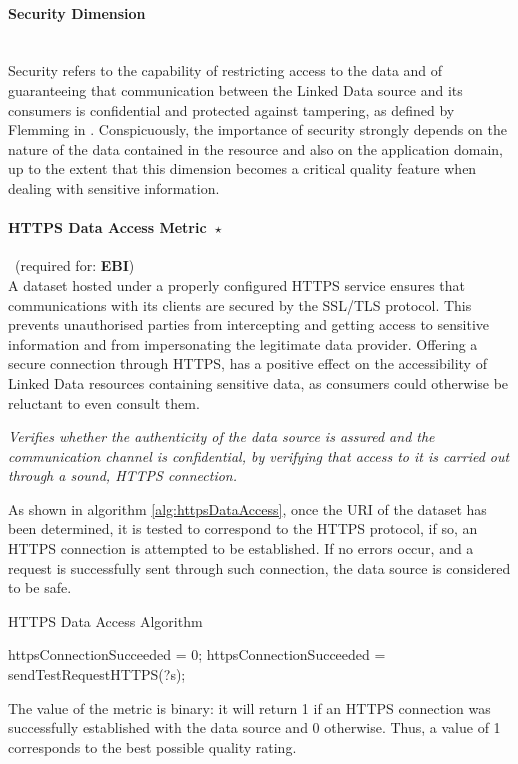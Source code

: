 

\paragraph{Security Dimension}~\\ %
Security refers to the capability of restricting access to the data and of guaranteeing that communication between the Linked Data source and its consumers is confidential and protected against tampering, as defined by Flemming in \cite{Flemming2008}. Conspicuously, the importance of security strongly depends on the nature of the data contained in the resource and also on the application domain, up to the extent that this dimension becomes a critical quality feature when dealing with sensitive information.


\paragraph{HTTPS Data Access Metric~$\star$}~(required for: \textbf{EBI}) ~\\ %
A dataset hosted under a properly configured HTTPS service ensures that communications with its clients are secured by the SSL/TLS protocol. This prevents unauthorised parties from intercepting and getting access to sensitive information and from impersonating the legitimate data provider. Offering a secure connection through HTTPS, has a positive effect on the accessibility of Linked Data resources containing sensitive data, as consumers could otherwise be reluctant to even consult them.

\begin{mdframed}[style=metricdefinition]
\emph{Verifies whether the authenticity of the data source is assured and the communication channel is confidential, by verifying that access to it is carried out through a sound, HTTPS connection.}
\end{mdframed}

As shown in algorithm \ref{alg:httpsDataAccess}, once the URI of the dataset has been determined, it is tested to correspond to the HTTPS protocol, if so, an HTTPS connection is attempted to be established. If no errors occur, and a request is successfully sent through such connection, the data source is considered to be safe.
\begin{algorithm}
\caption{HTTPS Data Access Algorithm} \label{alg:httpsDataAccess}
\begin{algorithmic}[1]
\State httpsConnectionSucceeded = 0;
\EndProcedure
{}
\State httpsConnectionSucceeded = sendTestRequestHTTPS(?s);
\EndIf
{}
\EndProcedure
\end{algorithmic}
\end{algorithm}
The value of the metric is binary: it will return 1 if an HTTPS connection was successfully established with the data source and 0 otherwise. Thus, a value of 1 corresponds to the best possible quality rating.

